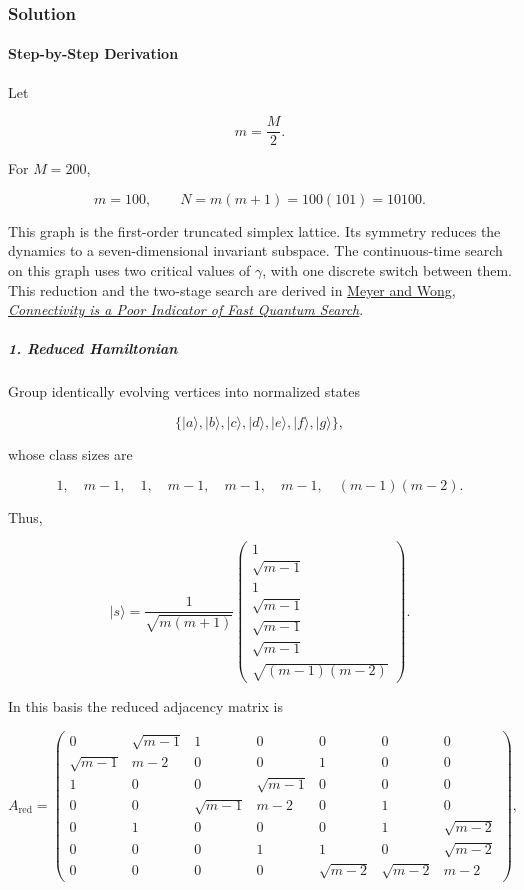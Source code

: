 \subsubsection*{Solution}
\paragraph*{Step-by-Step Derivation}

Let

\[
m=\frac{M}{2}.
\]

For $M=200$,

\[
m=100, \qquad N=m(m+1)=100(101)=10100.
\]

This graph is the first-order truncated simplex lattice. Its symmetry reduces the dynamics to a seven-dimensional invariant subspace. The continuous-time search on this graph uses two critical values of $\gamma$, with one discrete switch between them. This reduction and the two-stage search are derived in \href{\detokenize{https://link.aps.org/accepted/10.1103/PhysRevLett.114.110503}}{Meyer and Wong, \emph{Connectivity is a Poor Indicator of Fast Quantum Search}}.

\subparagraph*{1. Reduced Hamiltonian}

Group identically evolving vertices into normalized states

\[
\{|a\rangle,|b\rangle,|c\rangle,|d\rangle, |e\rangle,|f\rangle,|g\rangle\},
\]

whose class sizes are

\[
1,\quad m-1,\quad 1,\quad m-1,\quad m-1,\quad m-1, \quad (m-1)(m-2).
\]

Thus,

\[
|s\rangle
=
\frac{1}{\sqrt{m(m+1)}}
\begin{pmatrix}
1\\
\sqrt{m-1}\\
1\\
\sqrt{m-1}\\
\sqrt{m-1}\\
\sqrt{m-1}\\
\sqrt{(m-1)(m-2)}
\end{pmatrix}.
\]

In this basis the reduced adjacency matrix is

\[
A_{\mathrm{red}}=
\begin{pmatrix}
0&\sqrt{m-1}&1&0&0&0&0\\
\sqrt{m-1}&m-2&0&0&1&0&0\\
1&0&0&\sqrt{m-1}&0&0&0\\
0&0&\sqrt{m-1}&m-2&0&1&0\\
0&1&0&0&0&1&\sqrt{m-2}\\
0&0&0&1&1&0&\sqrt{m-2}\\
0&0&0&0&\sqrt{m-2}&\sqrt{m-2}&m-2
\end{pmatrix},
\]

